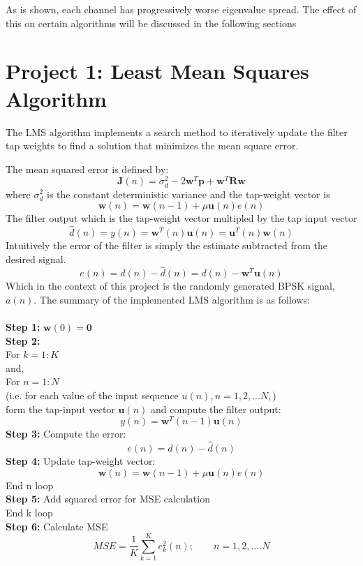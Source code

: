 \documentclass[journal]{IEEEtran}
\begin{document}
As is shown, each channel has progressively worse eigenvalue spread. The effect
of this on certain algorithms will be discussed in the following sections

\section{Project 1: Least Mean Squares Algorithm}
The LMS algorithm implements a search method to iteratively update the
filter tap weights to find a solution that minimizes the mean square error.

The mean squared error is defined by:
$$\boldsymbol{J}(n) = \sigma^2_d - 2\boldsymbol{w}^T\boldsymbol{p} + \boldsymbol{w}^T\boldsymbol{R}\boldsymbol{w}$$ where
$\sigma^2_d$ is the constant deterministic variance and the tap-weight vector is
$$ \boldsymbol{w}(n)= \boldsymbol{w}(n-1)+\mu\boldsymbol{u}(n)e(n)$$
The filter output which is the tap-weight vector multipled by the tap input vector
$$\hat{d}(n) = y(n) = \boldsymbol{w}^T(n)\boldsymbol{u}(n) = \boldsymbol{u}^T(n)\boldsymbol{w}(n)$$
Intuitively the error of the filter is simply the estimate subtracted from the desired signal.
$$e(n) = d(n) - \hat{d}(n) = d(n) - \boldsymbol{w}^T\boldsymbol{u}(n)$$
Which in the context of this project is the randomly generated BPSK signal, $a(n)$. The summary of the implemented LMS algorithm is as follows:\\
\\
\textbf{Step 1:} $\boldsymbol{w}(0) = \boldsymbol{0} $\\
\textbf{Step 2:}\\
For $k = 1:K$\\
and,\\
For $n = 1:N$\\
(i.e. for each value of the input sequence $u(n), n = 1,2,...N,$)
\\ \indent form the tap-input vector $\boldsymbol{u}(n)$ and compute the filter output:
\begin{equation}
  y(n) = \boldsymbol{w}^T(n-1)\boldsymbol{u}(n)
\end{equation}
\indent \textbf{Step 3:} Compute the error:
\begin{equation}
  e(n) = d(n) - \hat{d}(n)
\end{equation}
\indent \textbf{Step 4:} Update tap-weight vector:
\begin{equation}
  \boldsymbol{w}(n)= \boldsymbol{w}(n-1)+\mu\boldsymbol{u}(n)e(n)
\end{equation}
End n loop\\
\textbf{Step 5:} Add squared error for MSE calculation\\
End k loop\\
\textbf{Step 6:} Calculate MSE
\begin{equation}
  \label{eq:MSE}
  MSE=\dfrac{1}{K}\sum_{k=1}^{K}e_k^2(n); \qquad n = 1,2,....N
\end{equation}
\end{document}
